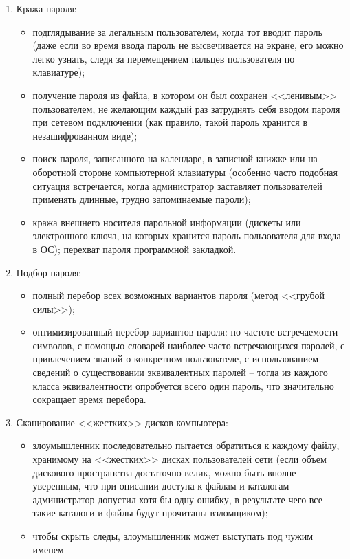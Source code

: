 \begin{enumerate}
  \item Кража пароля:
  \begin{itemize}
    \item подглядывание за легальным пользователем, когда тот вводит пароль
    (даже если во время ввода пароль не высвечивается на экране, его можно легко
    узнать, следя за перемещением пальцев пользователя по клавиатуре);
	\item получение пароля из файла, в котором он был сохранен <<ленивым>>
	пользователем, не желающим каждый раз затруднять себя вводом пароля при сетевом
	подключении (как правило, такой пароль хранится в незашифрованном виде);
	\item  поиск пароля, записанного на календаре, в записной книжке или на
	оборотной стороне компьютерной клавиатуры (особенно часто подобная ситуация
	встречается, когда администратор заставляет пользователей применять длинные,
	трудно запоминаемые пароли);
	\item кража внешнего носителя парольной информации (дискеты или электронного
	ключа, на которых хранится пароль пользователя для входа в ОС); перехват пароля
	программной закладкой.
  \end{itemize}	
  \item Подбор пароля:
  \begin{itemize}
    \item полный перебор всех возможных вариантов пароля (метод <<грубой
    силы>>);
	\item оптимизированный перебор вариантов пароля: по частоте встречаемости
	символов, с помощью словарей наиболее часто встречающихся паролей, с
	привлечением знаний о конкретном пользователе, с использованием сведений о
	существовании эквивалентных паролей -- тогда из каждого класса эквивалентности
	опробуется всего один пароль, что значительно сокращает время перебора.
  \end{itemize}
  \item Сканирование <<жестких>> дисков компьютера: 
  \begin{itemize}
    \item злоумышленник последовательно
пытается обратиться к каждому файлу, хранимому на <<жестких>> дисках
пользователей сети (если объем дискового пространства достаточно велик, можно
быть вполне уверенным, что при описании доступа к файлам и каталогам
администратор допустил хотя бы одну ошибку, в результате чего все такие каталоги
и файлы будут прочитаны взломщиком);
    \item чтобы скрыть следы, злоумышленник может выступать под чужим именем --

\end{itemize}
\end{enumerate}
